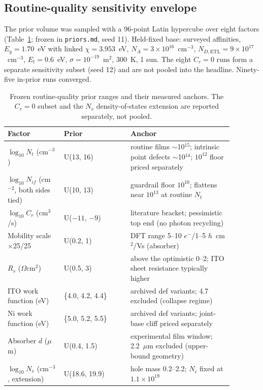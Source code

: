 \documentclass[11pt,a4paper]{article}
\begin{document}
\subsection{Routine-quality sensitivity envelope}

The prior volume was sampled with a 96-point Latin hypercube over eight factors (Table~\ref{tab:prior}; frozen in \texttt{priors.md}, seed 11). Held-fixed base: surveyed affinities, $E_g=1.70$~eV with linked $\chi=3.953$~eV, $N_A=3\times10^{16}$~cm$^{-3}$, $N_{D,\mathrm{ETL}}=9\times10^{17}$~cm$^{-3}$, $E_t=0.6$~eV, $\sigma=10^{-19}$~m$^2$, 300~K, 1 sun. The eight $C_r=0$ runs form a separate sensitivity subset (seed 12) and are not pooled into the headline. Ninety-five in-prior runs converged.

\begin{table}[tbp]
\centering
\caption{Frozen routine-quality prior ranges and their measured anchors. The $C_r=0$ subset and the $N_v$ density-of-states extension are reported separately, not pooled.}
\label{tab:prior}
\small
\begingroup
\setlength{\tabcolsep}{3pt}
\begin{tabular}{|p{0.22\linewidth}|p{0.26\linewidth}|p{0.40\linewidth}|}
\hline\hline
Factor & Prior & Anchor \\
\hline
$\log_{10}N_t$ (cm$^{-3}$) & U(13, 16) & routine films $\sim$10$^{15}$; intrinsic point defects $\sim$10$^{14}$; $10^{12}$ floor priced separately \\
$\log_{10}N_{if}$ (cm$^{-2}$, both sides tied) & U(10, 13) & guardrail floor $10^{10}$; flattens near $10^{13}$ at routine $N_t$ \\
$\log_{10}C_r$ (cm$^3$/s) & U($-11$, $-9$) & literature bracket; pessimistic top end (no photon recycling) \\
Mobility scale $\times$25/25 & U(0.2, 1) & DFT range 5--10 $e^-$/1--5 $h$~cm$^2$/Vs (absorber) \\
$R_s$ ($\Omega$cm$^2$) & U(0.5, 3) & above the optimistic 0--2; ITO sheet resistance typically higher \\
ITO work function (eV) & \{4.0, 4.2, 4.4\} & archived def variants; 4.7 excluded (collapse regime) \\
Ni work function (eV) & \{5.0, 5.2, 5.5\} & archived def variants; joint-base cliff priced separately \\
Absorber $d$ ($\mu$m) & U(0.4, 1.5) & experimental film window; 2.2~$\mu$m excluded (upper-bound geometry) \\
$\log_{10}N_v$ (cm$^{-3}$, extension) & U(18.6, 19.9) & hole mass 0.2--2.2; $N_c$ fixed at $1.1\times10^{19}$ \\
\hline\hline
\end{tabular}
\endgroup
\end{table}
\end{document}
